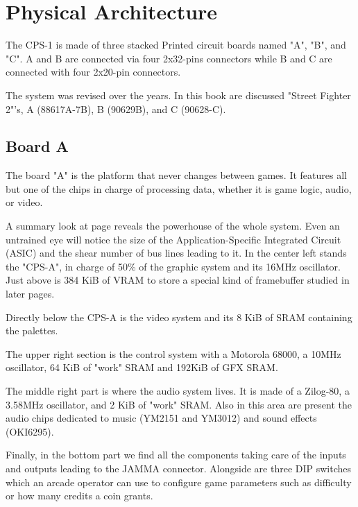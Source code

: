   


\section{Physical Architecture}
 The CPS-1 is made of three stacked Printed circuit boards named "A", "B", and "C". A and B are connected via four 2x32-pins connectors while B and C are connected with four 2x20-pin connectors.

The system was revised over the years. In this book are discussed "Street Fighter 2"'s, A (88617A-7B), B (90629B), and C (90628-C).

\begin{figure}[H]
\centering
{}
\end{figure}


\subsection{Board A} 
The board "A" is the platform that never changes between games. It features all but one of the chips in charge of processing data, whether it is game logic, audio, or video.

A summary look at page \pageref{fig:boarda} reveals the powerhouse of the whole system. Even an untrained eye will notice the size of the Application-Specific Integrated Circuit (ASIC) and the shear number of bus lines leading to it. In the center left stands the "CPS-A", in charge of 50\% of the graphic system and its 16MHz oscillator. Just above is 384 KiB of VRAM to store a special kind of framebuffer studied in later pages.

Directly below the CPS-A is the video system and its 8 KiB of SRAM containing the palettes.

The upper right section is the control system with a Motorola 68000, a 10MHz oscillator, 64 KiB of "work" SRAM and 192KiB of GFX SRAM. 

The middle right part is where the audio system lives. It is made of a Zilog-80, a 3.58MHz oscillator, and 2 KiB of "work" SRAM. Also in this area are present the audio chips dedicated to music (YM2151 and YM3012) and sound effects (OKI6295).

Finally, in the bottom part we find all the components taking care of the inputs and outputs leading to the JAMMA connector. Alongside are three DIP switches which an arcade operator can use to configure game parameters such as difficulty or how many credits a coin grants.


